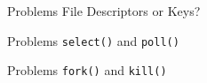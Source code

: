
\begin{slide}{Problems}
  \LARGE
  File Descriptors or Keys?
\end{slide}

\begin{slide}{Problems}
  \LARGE
  \texttt{select()} and \texttt{poll()}
\end{slide}

\begin{slide}{Problems}
  \LARGE
  \texttt{fork()} and \texttt{kill()}
\end{slide}
